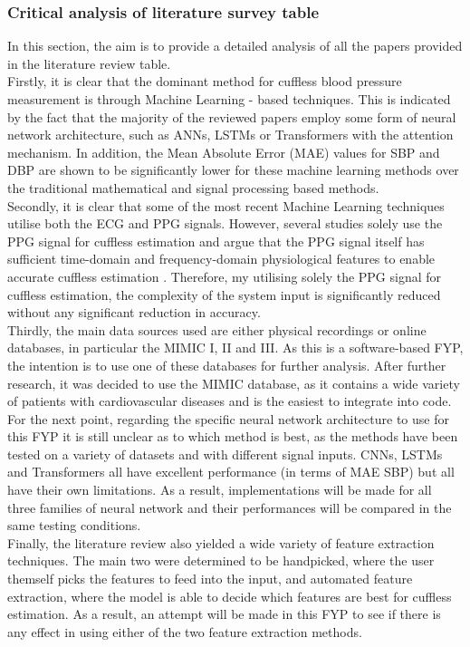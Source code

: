 \subsubsection{Critical analysis of literature survey table}
In this section, the aim is to provide a detailed analysis of all the papers provided 
in the literature review table. \\ \newline \noindent Firstly, it is clear that the dominant method for cuffless 
blood pressure measurement is through Machine Learning - based techniques. This is indicated by the 
fact that the majority of the reviewed papers employ some form of neural network architecture, such as ANNs, LSTMs or Transformers with the attention mechanism. In addition, the Mean Absolute Error (MAE) values for SBP and DBP are shown to be significantly lower 
for these machine learning methods over the traditional mathematical and signal processing based 
methods.\\ \newline \noindent Secondly, it is clear that some of the most recent Machine Learning techniques utilise both the ECG and PPG signals. 
However, several studies solely use the PPG signal for cuffless estimation and argue that the PPG signal itself has sufficient time-domain and frequency-domain physiological 
features to enable accurate cuffless estimation \cite{slapnicar2019} \cite{ElHajj2021} \cite{Wang2022}. Therefore, my utilising solely the PPG signal for cuffless estimation, the complexity of the system input is significantly reduced without 
any significant reduction in accuracy.\\ \newline \noindent Thirdly, the main data sources used are either physical recordings or online databases, in particular the MIMIC I, II and III. As this is a software-based FYP, the intention is to use one of these databases for further analysis. 
After further research, it was decided to use the MIMIC database, as it contains a wide variety of patients with cardiovascular diseases and is the easiest to integrate into code.\\ \newline \noindent For the next point, regarding the specific neural network architecture to use for this FYP it is still unclear as 
to which method is best, as the methods have been tested on a variety of datasets and with different signal inputs. CNNs, LSTMs and Transformers all have excellent performance (in terms of MAE SBP) 
but all have their own limitations. As a result, implementations will be made for all three families of neural network and their performances will be compared in the same testing conditions.\\ \newline \noindent Finally, the literature review 
also yielded a wide variety of feature extraction techniques. The main two were determined to be handpicked, where the user themself picks the features to feed into the input, and automated feature extraction, where the model is able to decide which features are best for cuffless estimation. As a result, an attempt will be made in this FYP to see if there is any effect in using either of the two feature extraction methods.

